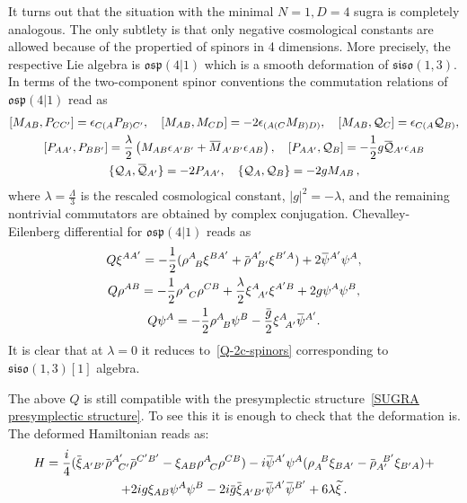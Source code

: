 \documentclass[a4paper,12pt]{article}
\numberwithin{equation}{section} %
\renewcommand{\tilde}{\widetilde}
\numberwithin{equation}{section}
\newcommand{\overbar}[1]{\mkern 1.5mu\overline{\mkern-1.5mu#1\mkern-1.5mu}\mkern 1.5mu}
\newcommand{\psibar}{\overbar{\psi}}
\newcommand{\rhobar}{\overbar{\rho}}
\newcommand{\xitilde}{\tilde{\xi}}
\newcommand{\xibar}{\overbar{\xi}}
\newcommand{\Aprime}{{A'}}
\newcommand{\Bprime}{{B'}}
\newcommand{\Q}{\mathcal{Q}}
\newcommand{\Qbar}{\overbar{\Q}}
\newcommand{\gbar}{\overbar{g}}
\begin{document}
It turns out that the situation with the minimal $N=1,D=4$ sugra is completely analogous. The only subtlety is that only negative cosmological constants are allowed because of the propertied of spinors in 4 dimensions. More precisely, the respective Lie algebra is $\mathfrak{osp(4|1)}$ which is a smooth deformation of $\mathfrak{siso}(1,3)$. In terms of the two-component spinor conventions the commutation relations of 
$\mathfrak{osp}(4|1)$ read as
\begin{equation}
\begin{gathered}
    [M_{AB}, P_{CC'}] = \epsilon_{C(A} P_{B)C'},\quad  [M_{AB},M_{CD}] = -2\epsilon_{(A(C}M_{B)D)}, \quad [M_{AB}, \Q_C] =\epsilon_{C(A} \Q_{B)}, \\
     [P_{AA'}, P_{BB'}] = \frac{\lambda}{2}\left(M_{AB}\epsilon_{A'B'} + \overbar{M}_{A'B'} \epsilon_{AB}\right), \quad [P_{AA'}, \Q_B] = -\frac{1}{2}g\Qbar_{A'}\epsilon_{AB}\\
     \{\mathcal{Q}_A,  \overbar{\mathcal{Q}}_{A'}\} = -2P_{AA'}, \quad  \{\Q_A,\Q_B\} = -2gM_{AB}\,,
\end{gathered}
\end{equation}
where $\lambda = \frac{\Lambda}{3}$ is the rescaled cosmological constant,
$|g|^2 = -\lambda$, and the remaining nontrivial commutators are obtained by complex conjugation. Chevalley-Eilenberg differential for $\mathfrak{osp(4|1)}$ reads as
\begin{equation}
\begin{gathered}
    Q\xi^{AA'} = -\frac{1}{2}(\rho^{A}_{\enspace B}\xi^{B\Aprime} + \rhobar^{\Aprime}_{\enspace\Bprime}\xi^{\Bprime A})+2\psibar^\Aprime\psi^A,\\
    Q\rho^{AB} = -\frac{1}{2} \rho^A_{\enspace C}\rho^{C B} + \frac{\lambda}{2}\xi^A_{\enspace A'}\xi^{A'B} +2g\psi^A\psi^B,\\
    Q\psi^A = -\frac{1}{2}\rho^A_{\enspace B}\psi^B - \frac{\gbar}{2} \xi^A_{\enspace A'}\psibar^\Aprime.
\end{gathered}
\end{equation}
It is clear that at $\lambda=0$ it reduces to~\eqref{Q-2c-spinors} corresponding to $\mathfrak{siso}(1,3)[1]$ algebra.

The above $Q$ is still compatible with the presymplectic structure~\eqref{SUGRA presymplectic structure}. To see this it is enough to check that the deformation is. The deformed Hamiltonian reads as:
\begin{multline}
    H = \frac{i}{4}(\xibar_{A'B'} \rhobar^{A'}_{\enspace C'} \rhobar^{C'B'}-\xi_{A B}\rho^{A}_{\enspace C} \rho^{C B}) -i \psibar^\Aprime\psi^A(\rho_{A}^{\enspace B}\xi_{BA'} - \rhobar_{A'}^{\enspace B'}\xi_{B' A}) +\\ 
    +2ig\xi_{AB}\psi^A\psi^B - 2i\gbar\xibar_{A'B'}\psibar^\Aprime\psibar^\Bprime+6\lambda\xitilde\,.
\end{multline}
\end{document}
